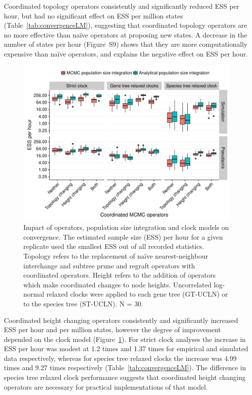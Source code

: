 \documentclass[12pt]{article}
\begin{document}
Coordinated topology operators consistently and significantly reduced ESS
per hour, but had no significant effect on ESS per million states
(Table~\ref{tab:convergenceLM}), suggesting that coordinated topology
operators are no more effective than na\"ive operators at proposing new
states. A decrease in the number of states per hour (Figure~S9) shows that
they are more computationally expensive than na\"ive operators, and explains
the negative effect on ESS per hour.

\begin{figure}[htb!]
\centering
\includegraphics[width=130mm]{minimum-ess_per_hour-starbeast2.pdf}
\caption
{Impact of operators, population size integration and clock models on
convergence. The estimated sample size (ESS) per hour for a given replicate
used the smallest ESS out of all recorded statistics. Topology refers to the
replacement of na\"ive nearest-neighbour interchange and subtree prune and
regraft operators with coordinated operators. Height refers to the addition of
operators which make coordinated changes to node heights. Uncorrelated log-normal relaxed clocks were applied to each gene tree (GT-UCLN) or to
the species tree (ST-UCLN). N = 30.}
\label{fig:realEssPerHour}
\end{figure}

Coordinated height changing operators consistently and significantly
increased ESS per hour and per million states, however the degree of
improvement depended on the clock model (Figure~\ref{fig:realEssPerHour}). For
strict clock analyses the increase in ESS per hour was modest at 1.2 times and
1.37 times for empirical and simulated data respectively, whereas for species
tree relaxed clocks the increase was 4.99 times and 9.27 times respectively
(Table~\ref{tab:convergenceLM}). The difference in species tree relaxed clock
performance suggests that coordinated height changing operators are necessary
for practical implementations of that model.
\end{document}
